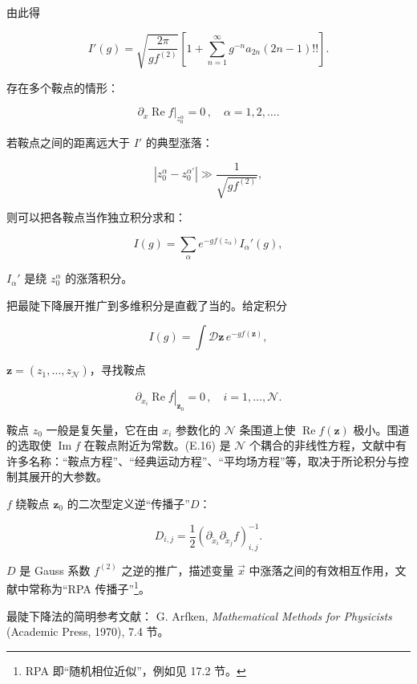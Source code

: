由此得

\begin{equation*}
I ' ( g ) = \sqrt {\frac {2 \pi}{g f^ {(2)}}} \left[ 1 + \sum_{n = 1} ^ {\infty} g ^ {- n} a_{2n} \left( 2n - 1 \right)!! \right].
\tag{E.11}
\end{equation*}

存在多个鞍点的情形：

\begin{equation*}
\left. \partial_ {x} \operatorname{Re} f \right|_{z _ {0} ^ {\alpha}} = 0 \, , \quad \alpha = 1, 2, \dots .
\tag{E.12}
\end{equation*}

若鞍点之间的距离远大于 $I'$ 的典型涨落：

\begin{equation*}
\left| z _ {0} ^ {\alpha} - z _ {0} ^ {\alpha '} \right| \gg \frac {1}{\sqrt {g f^ {(2)}}} ,
\tag{E.13}
\end{equation*}

则可以把各鞍点当作独立积分求和：

\begin{equation*}
I ( g ) = \sum_ {\alpha} e ^ {- g f ( z _ {\alpha} )} I _ {\alpha} ' ( g ) ,
\tag{E.14}
\end{equation*}

$I_{\alpha}'$ 是绕 $z_0^\alpha$ 的涨落积分。

把最陡下降展开推广到多维积分是直截了当的。给定积分

\begin{equation*}
I ( g ) = \int \mathcal {D} \mathbf {z} \, e ^ {- g f ( \mathbf {z} )} ,
\tag{E.15}
\end{equation*}

$\mathbf{z} = (z_1, \ldots, z_{\mathcal{N}})$，寻找鞍点

\begin{equation*}
\left. \partial_ {x _ {i}} \operatorname{Re} f \right|_{\mathbf {z} _ {0}} = 0 \, , \quad i = 1, \dots , \mathcal {N}.
\tag{E.16}
\end{equation*}

鞍点 $z_{0}$ 一般是复矢量，它在由 $x_{i}$ 参数化的 $\mathcal{N}$ 条围道上使 $\operatorname{Re}f(\mathbf{z})$ 极小。围道的选取使 $\operatorname{Im}f$ 在鞍点附近为常数。(E.16) 是 $\mathcal{N}$ 个耦合的非线性方程，文献中有许多名称：“鞍点方程”、“经典运动方程”、“平均场方程”等，取决于所论积分与控制其展开的大参数。

$f$ 绕鞍点 $\mathbf{z}_0$ 的二次型定义逆“传播子”$D$：

\begin{equation*}
D _ {i, j} = \frac {1}{2} \left( \partial_{\tilde {x} _ {i}} \partial_{\tilde {x} _ {j}} f \right)_{i, j} ^ {- 1}.
\tag{E.17}
\end{equation*}

$D$ 是 Gauss 系数 $f^{(2)}$ 之逆的推广，描述变量 $\vec{x}$ 中涨落之间的有效相互作用，文献中常称为“RPA 传播子”\footnote{RPA 即“随机相位近似”，例如见 17.2 节。}。

\begin{chapbib}
\item 最陡下降法的简明参考文献：
  G. Arfken, \textit{Mathematical Methods for Physicists} (Academic Press, 1970), 7.4 节。
\end{chapbib}
